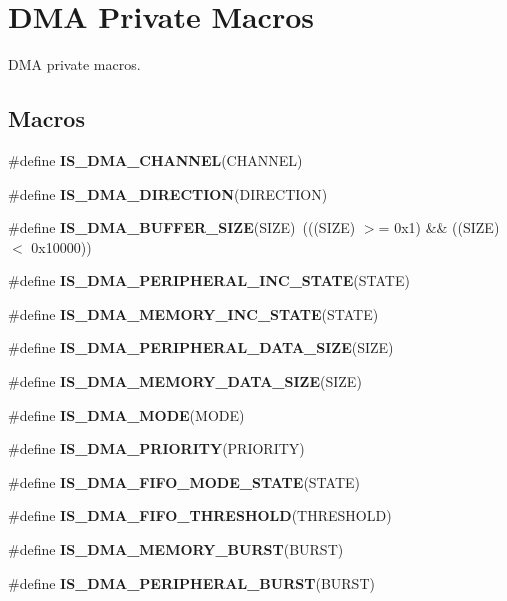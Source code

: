 \hypertarget{group___d_m_a___private___macros}{}\section{D\+MA Private Macros}
\label{group___d_m_a___private___macros}


D\+MA private macros.  


\subsection*{Macros}
\begin{DoxyCompactItemize}
\item 
\#define {\bfseries I\+S\+\_\+\+D\+M\+A\+\_\+\+C\+H\+A\+N\+N\+EL}(C\+H\+A\+N\+N\+EL)
\item 
\#define {\bfseries I\+S\+\_\+\+D\+M\+A\+\_\+\+D\+I\+R\+E\+C\+T\+I\+ON}(D\+I\+R\+E\+C\+T\+I\+ON)
\item 
\#define {\bfseries I\+S\+\_\+\+D\+M\+A\+\_\+\+B\+U\+F\+F\+E\+R\+\_\+\+S\+I\+ZE}(S\+I\+ZE)~(((S\+I\+ZE) $>$= 0x1) \&\& ((\+S\+I\+Z\+E) $<$ 0x10000))\hypertarget{group___d_m_a___private___macros_ga72ef4033bb3bc2cdfdbe579083b05e32}{}\label{group___d_m_a___private___macros_ga72ef4033bb3bc2cdfdbe579083b05e32}

\item 
\#define {\bfseries I\+S\+\_\+\+D\+M\+A\+\_\+\+P\+E\+R\+I\+P\+H\+E\+R\+A\+L\+\_\+\+I\+N\+C\+\_\+\+S\+T\+A\+TE}(S\+T\+A\+TE)
\item 
\#define {\bfseries I\+S\+\_\+\+D\+M\+A\+\_\+\+M\+E\+M\+O\+R\+Y\+\_\+\+I\+N\+C\+\_\+\+S\+T\+A\+TE}(S\+T\+A\+TE)
\item 
\#define {\bfseries I\+S\+\_\+\+D\+M\+A\+\_\+\+P\+E\+R\+I\+P\+H\+E\+R\+A\+L\+\_\+\+D\+A\+T\+A\+\_\+\+S\+I\+ZE}(S\+I\+ZE)
\item 
\#define {\bfseries I\+S\+\_\+\+D\+M\+A\+\_\+\+M\+E\+M\+O\+R\+Y\+\_\+\+D\+A\+T\+A\+\_\+\+S\+I\+ZE}(S\+I\+ZE)
\item 
\#define {\bfseries I\+S\+\_\+\+D\+M\+A\+\_\+\+M\+O\+DE}(M\+O\+DE)
\item 
\#define {\bfseries I\+S\+\_\+\+D\+M\+A\+\_\+\+P\+R\+I\+O\+R\+I\+TY}(P\+R\+I\+O\+R\+I\+TY)
\item 
\#define {\bfseries I\+S\+\_\+\+D\+M\+A\+\_\+\+F\+I\+F\+O\+\_\+\+M\+O\+D\+E\+\_\+\+S\+T\+A\+TE}(S\+T\+A\+TE)
\item 
\#define {\bfseries I\+S\+\_\+\+D\+M\+A\+\_\+\+F\+I\+F\+O\+\_\+\+T\+H\+R\+E\+S\+H\+O\+LD}(T\+H\+R\+E\+S\+H\+O\+LD)
\item 
\#define {\bfseries I\+S\+\_\+\+D\+M\+A\+\_\+\+M\+E\+M\+O\+R\+Y\+\_\+\+B\+U\+R\+ST}(B\+U\+R\+ST)
\item 
\#define {\bfseries I\+S\+\_\+\+D\+M\+A\+\_\+\+P\+E\+R\+I\+P\+H\+E\+R\+A\+L\+\_\+\+B\+U\+R\+ST}(B\+U\+R\+ST)
\end{DoxyCompactItemize}


